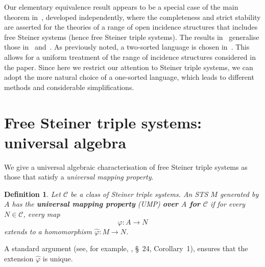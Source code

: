\documentclass[a4paper, 11pt]{article}
\theoremstyle{note}
\newtheorem{df}[thm]{Definition}
\begin{document}
Our elementary equivalence result appears to be a special case of the main theorem in~\cite{paoquad}, developed independently, where the completeness and strict stability are asserted for the theories of a range of open incidence structures that includes free Steiner systems (hence free Steiner triple systems). The results in~\cite{paoquad} generalise those in~\cite{ammertent} and~\cite{hyttpao}. As previously noted, a two-sorted language is chosen in~\cite{paoquad}. This allows for a uniform treatment of the range of incidence structures considered in the paper. Since here we restrict our attention to Steiner triple systems, we can adopt the more natural choice of a one-sorted language, which leads to different methods and considerable simplifications.




	\section{Free Steiner triple systems: universal algebra}
 \label{section2}
We give a universal algebraic characterisation of free Steiner triple systems  as those that satisfy a \textit{universal mapping property}. 
	
	 \begin{df} Let $\mathcal{C}$ be a class of Steiner triple systems. An STS $M$ generated by $A$ has the \textbf{universal mapping property} (UMP)  \textbf{over $A$ for $\mathcal{C}$} if for every $N \in \mathcal{C}$, every map
 \[ \varphi : A \to N \]
extends to a homomorphism $ \hat{\varphi} : M \to N $.

 \end{df} 
  A standard argument (see, for example, \cite{gratzer}, \S~24, Corollary~1), ensures that the extension $\hat{\varphi}$ is unique.
 
\end{document}
